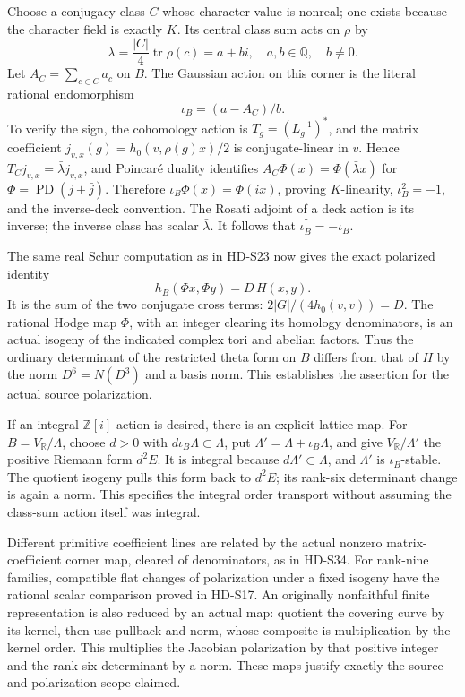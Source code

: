 Choose a conjugacy class \(C\) whose character value is nonreal;
one exists because the character field is exactly \(K\). Its central
class sum acts on \(\rho\) by
\[
          \lambda=\frac{|C|}{4}\operatorname{tr}\rho(c)
                         =a+bi,\quad a,b\in\mathbb Q,
                         \quad b\ne0.
\]
Let \(A_C=\sum_{c\in C}a_c\) on \(B\). The Gaussian action on
this corner is the literal rational endomorphism
\[
                        \iota_B=(a-A_C)/b.                  \tag{S35.7}
\]
To verify the sign, the cohomology action is
\(T_g=(L_g^{-1})^*\), and the matrix coefficient
\(j_{v,x}(g)=h_0(v,\rho(g)x)/2\) is conjugate-linear in \(v\).
Hence \(T_Cj_{v,x}=\bar\lambda j_{v,x}\), and Poincar\'e duality
identifies \(A_C\Phi(x)=\Phi(\bar\lambda x)\) for
\(\Phi=\operatorname{PD}(j+\bar j)\). Therefore
\(\iota_B\Phi(x)=\Phi(ix)\), proving \(K\)-linearity,
\(\iota_B^2=-1\), and the inverse-deck convention. The Rosati
adjoint of a deck action is its inverse; the inverse class has scalar
\(\bar\lambda\). It follows that \(\iota_B^\dagger=-\iota_B\).

The same real Schur computation as in HD-S23 now gives the exact
polarized identity
\[
                   h_B(\Phi x,\Phi y)=D\,H(x,y).            \tag{S35.8}
\]
It is the sum of the two conjugate cross terms:
\(2|G|/(4h_0(v,v))=D\). The rational Hodge map \(\Phi\),
with an integer clearing its homology denominators, is an actual
isogeny of the indicated complex tori and abelian factors. Thus the
ordinary determinant of the restricted theta form on \(B\) differs
from that of \(H\) by the norm \(D^6=N(D^3)\) and a basis norm.
This establishes the assertion for the actual source polarization.

If an integral \(\mathbb Z[i]\)-action is desired, there is an
explicit lattice map. For \(B=V_\mathbb R/\Lambda\), choose
\(d>0\) with \(d\iota_B\Lambda\subset\Lambda\), put
\(\Lambda'=\Lambda+\iota_B\Lambda\), and give \(V_\mathbb R/\Lambda'\)
the positive Riemann form \(d^2E\). It is integral because
\(d\Lambda'\subset\Lambda\), and \(\Lambda'\) is \(\iota_B\)-stable.
The quotient isogeny pulls this form back to \(d^2E\); its
rank-six determinant change is again a norm. This specifies the
integral order transport without assuming the class-sum action itself
was integral.

Different primitive coefficient lines are related by the actual
nonzero matrix-coefficient corner map, cleared of denominators, as
in HD-S34. For rank-nine families, compatible flat changes of
polarization under a fixed isogeny have the rational scalar comparison
proved in HD-S17. An originally nonfaithful finite representation is
also reduced by an actual map: quotient the covering curve by its
kernel, then use pullback and norm, whose composite is multiplication
by the kernel order. This multiplies the Jacobian polarization by
that positive integer and the rank-six determinant by a norm.
These maps justify exactly the source and polarization scope claimed.

